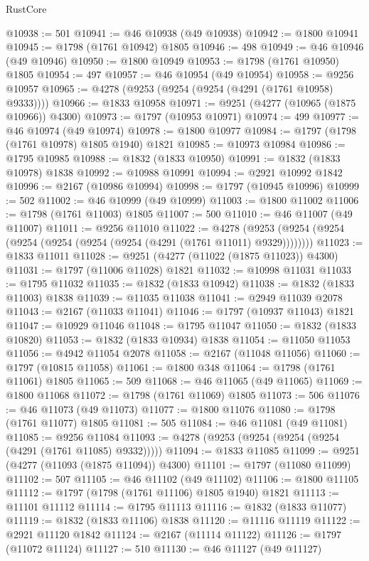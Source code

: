 \begin{lexlean}{RustCore}
\begin{coremodule}
@10938 := 501
@10941 := @46 @10938 (@49 @10938)
@10942 := @1800 @10941
@10945 := @1798 (@1761 @10942) @1805
@10946 := 498
@10949 := @46 @10946 (@49 @10946)
@10950 := @1800 @10949
@10953 := @1798 (@1761 @10950) @1805
@10954 := 497
@10957 := @46 @10954 (@49 @10954)
@10958 := @9256 @10957
@10965 := @4278 (@9253 (@9254 (@9254 (@4291 (@1761 @10958) @9333))))
@10966 := @1833 @10958
@10971 := @9251 (@4277 (@10965 (@1875 @10966)) @4300)
@10973 := @1797 (@10953 @10971)
@10974 := 499
@10977 := @46 @10974 (@49 @10974)
@10978 := @1800 @10977
@10984 := @1797 (@1798 (@1761 @10978) @1805 @1940) @1821
@10985 := @10973 @10984
@10986 := @1795 @10985
@10988 := @1832 (@1833 @10950)
@10991 := @1832 (@1833 @10978) @1838
@10992 := @10988 @10991
@10994 := @2921 @10992 @1842
@10996 := @2167 (@10986 @10994)
@10998 := @1797 (@10945 @10996)
@10999 := 502
@11002 := @46 @10999 (@49 @10999)
@11003 := @1800 @11002
@11006 := @1798 (@1761 @11003) @1805
@11007 := 500
@11010 := @46 @11007 (@49 @11007)
@11011 := @9256 @11010
@11022 := @4278 (@9253 (@9254 (@9254 (@9254 (@9254 (@9254 (@9254 (@4291 (@1761 @11011) @9329))))))))
@11023 := @1833 @11011
@11028 := @9251 (@4277 (@11022 (@1875 @11023)) @4300)
@11031 := @1797 (@11006 @11028) @1821
@11032 := @10998 @11031
@11033 := @1795 @11032
@11035 := @1832 (@1833 @10942)
@11038 := @1832 (@1833 @11003) @1838
@11039 := @11035 @11038
@11041 := @2949 @11039 @2078
@11043 := @2167 (@11033 @11041)
@11046 := @1797 (@10937 @11043) @1821
@11047 := @10929 @11046
@11048 := @1795 @11047
@11050 := @1832 (@1833 @10820)
@11053 := @1832 (@1833 @10934) @1838
@11054 := @11050 @11053
@11056 := @4942 @11054 @2078
@11058 := @2167 (@11048 @11056)
@11060 := @1797 (@10815 @11058)
@11061 := @1800 @348
@11064 := @1798 (@1761 @11061) @1805
@11065 := 509
@11068 := @46 @11065 (@49 @11065)
@11069 := @1800 @11068
@11072 := @1798 (@1761 @11069) @1805
@11073 := 506
@11076 := @46 @11073 (@49 @11073)
@11077 := @1800 @11076
@11080 := @1798 (@1761 @11077) @1805
@11081 := 505
@11084 := @46 @11081 (@49 @11081)
@11085 := @9256 @11084
@11093 := @4278 (@9253 (@9254 (@9254 (@9254 (@4291 (@1761 @11085) @9332)))))
@11094 := @1833 @11085
@11099 := @9251 (@4277 (@11093 (@1875 @11094)) @4300)
@11101 := @1797 (@11080 @11099)
@11102 := 507
@11105 := @46 @11102 (@49 @11102)
@11106 := @1800 @11105
@11112 := @1797 (@1798 (@1761 @11106) @1805 @1940) @1821
@11113 := @11101 @11112
@11114 := @1795 @11113
@11116 := @1832 (@1833 @11077)
@11119 := @1832 (@1833 @11106) @1838
@11120 := @11116 @11119
@11122 := @2921 @11120 @1842
@11124 := @2167 (@11114 @11122)
@11126 := @1797 (@11072 @11124)
@11127 := 510
@11130 := @46 @11127 (@49 @11127)

\end{coremodule}
\end{lexlean}
